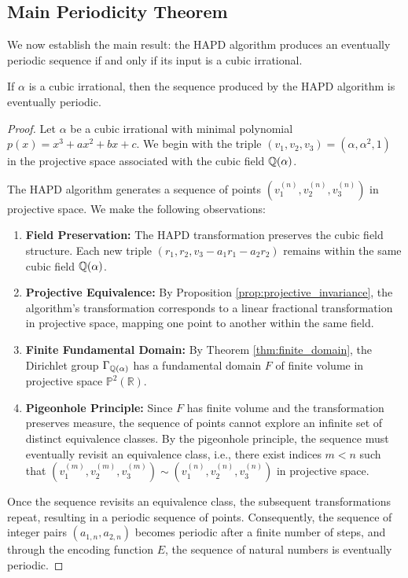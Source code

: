 \subsection{Main Periodicity Theorem}

We now establish the main result: the HAPD algorithm produces an eventually periodic sequence if and only if its input is a cubic irrational.

\begin{theorem}\label{thm:cubic_periodic}
If $\alpha$ is a cubic irrational, then the sequence produced by the HAPD algorithm is eventually periodic.
\end{theorem}

\begin{proof}
Let $\alpha$ be a cubic irrational with minimal polynomial $p(x) = x^3 + ax^2 + bx + c$. We begin with the triple $(v_1, v_2, v_3) = (\alpha, \alpha^2, 1)$ in the projective space associated with the cubic field $\mathbb{Q}(\alpha)$.

The HAPD algorithm generates a sequence of points $(v_1^{(n)}, v_2^{(n)}, v_3^{(n)})$ in projective space. We make the following observations:

\begin{enumerate}
    \item \textbf{Field Preservation:} The HAPD transformation preserves the cubic field structure. Each new triple $(r_1, r_2, v_3 - a_1r_1 - a_2r_2)$ remains within the same cubic field $\mathbb{Q}(\alpha)$.
    
    \item \textbf{Projective Equivalence:} By Proposition \ref{prop:projective_invariance}, the algorithm's transformation corresponds to a linear fractional transformation in projective space, mapping one point to another within the same field.
    
    \item \textbf{Finite Fundamental Domain:} By Theorem \ref{thm:finite_domain}, the Dirichlet group $\Gamma_{\mathbb{Q}(\alpha)}$ has a fundamental domain $F$ of finite volume in projective space $\mathbb{P}^2(\mathbb{R})$.
    
    \item \textbf{Pigeonhole Principle:} Since $F$ has finite volume and the transformation preserves measure, the sequence of points cannot explore an infinite set of distinct equivalence classes. By the pigeonhole principle, the sequence must eventually revisit an equivalence class, i.e., there exist indices $m < n$ such that $(v_1^{(m)}, v_2^{(m)}, v_3^{(m)}) \sim (v_1^{(n)}, v_2^{(n)}, v_3^{(n)})$ in projective space.
\end{enumerate}

Once the sequence revisits an equivalence class, the subsequent transformations repeat, resulting in a periodic sequence of points. Consequently, the sequence of integer pairs $(a_{1,n}, a_{2,n})$ becomes periodic after a finite number of steps, and through the encoding function $E$, the sequence of natural numbers is eventually periodic.
\end{proof}

